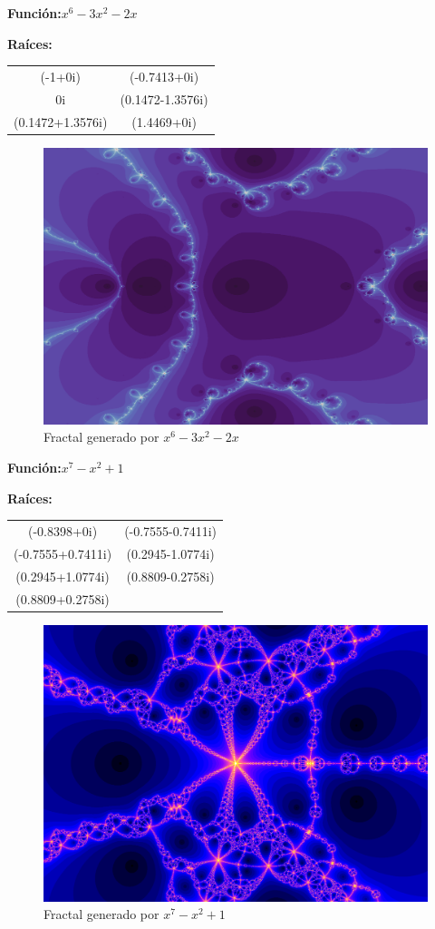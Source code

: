 \textbf{Función:}$x^6-3x^2-2x$

\textbf{Raíces:}

\begin{center}
\begin{tabular}{ c c  }
    (-1+0i) & (-0.7413+0i) \\ 
    0i & (0.1472-1.3576i) \\ 
    (0.1472+1.3576i) & (1.4469+0i)
 
\end{tabular}
\end{center}

\begin{figure}[H]
    \centering
    \includegraphics[scale=0.26]{images/ej4.png}
    \caption{Fractal generado por $x^6-3x^2-2x$}
    \label{fig:ej_4}
\end{figure}

\textbf{Función:}$x^7-x^2+1$

\textbf{Raíces:}

\begin{center}
\begin{tabular}{ c c  }
 (-0.8398+0i) & (-0.7555-0.7411i) \\ 
 (-0.7555+0.7411i) & (0.2945-1.0774i) \\ 
 (0.2945+1.0774i) & (0.8809-0.2758i) \\
 (0.8809+0.2758i)
\end{tabular}
\end{center}

\begin{figure}[H]
    \centering
    \includegraphics[scale=0.26]{images/ej5.png}
    \caption{Fractal generado por $x^7-x^2+1$}
    \label{fig:ej_5}
\end{figure}